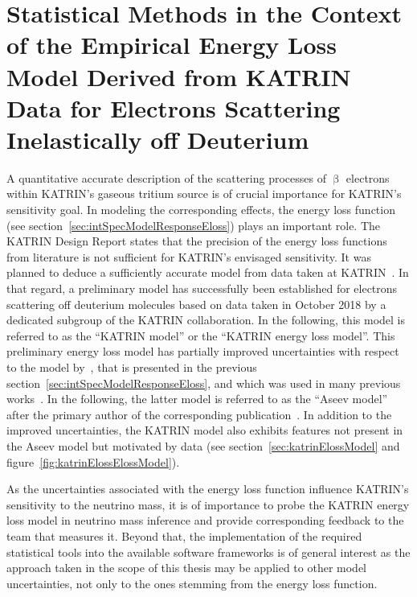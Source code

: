 \def\currentRootFolder{chapter/sensitivityStudyWithPreliminaryKatrinElossModel}
\def\currentFigureFolder{\currentRootFolder/fig}

\chapter{Statistical Methods in the Context of the Empirical Energy Loss Model Derived from KATRIN Data for Electrons Scattering Inelastically off Deuterium}
\label{sec:katrinEloss}
A quantitative accurate description of the scattering processes of $\upbeta$ electrons within KATRIN's gaseous tritium source is of crucial importance for KATRIN's sensitivity goal. In modeling the corresponding effects, the energy loss function (see section~\ref{sec:intSpecModelResponseEloss}) plays an important role. The KATRIN Design Report states that the precision of the energy loss functions from literature is not sufficient for KATRIN's envisaged sensitivity. It was planned to deduce a sufficiently accurate model from data taken at KATRIN~\cite{Angrik:2005ep}. In that regard, a preliminary model has successfully been established for electrons scattering off deuterium molecules based on data taken in October 2018 by a dedicated subgroup of the KATRIN collaboration. In the following, this model is referred to as the ``KATRIN model'' or the ``KATRIN energy loss model''. This preliminary energy loss model has partially improved uncertainties with respect to the model by~\cite{Aseev2000}, that is presented in the previous section~\ref{sec:intSpecModelResponseEloss}, and which was used in many previous works~\cite{Groh2015,Kleesiek2014, Kleesiek2019, SeitzM2019}. In the following, the latter model is referred to as the ``Aseev model'' after the primary author of the corresponding publication~\cite{Aseev2000}. In addition to the improved uncertainties, the KATRIN model also exhibits features not present in the Aseev model but motivated by data (see section~\ref{sec:katrinElossModel} and figure~\ref{fig:katrinElossElossModel}). 

As the uncertainties associated with the energy loss function influence KATRIN's sensitivity to the neutrino mass, it is of importance to probe the KATRIN energy loss model in neutrino mass inference and provide corresponding feedback to the team that measures it. Beyond that, the implementation of the required statistical tools into the available software frameworks is of general interest as the approach taken in the scope of this thesis may be applied to other model uncertainties, not only to the ones stemming from the energy loss function. 

